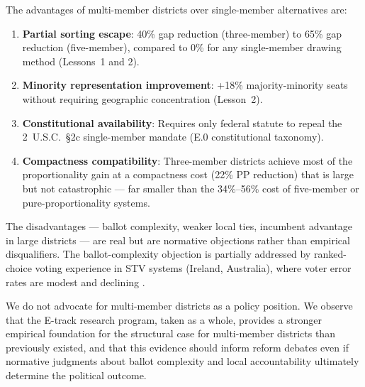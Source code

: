 The advantages of multi-member districts over single-member alternatives are:
\begin{enumerate}
  \item \textbf{Partial sorting escape}: 40\% gap reduction (three-member) to
        65\% gap reduction (five-member), compared to 0\% for any single-member
        drawing method (Lessons~1 and 2).
  \item \textbf{Minority representation improvement}: +18\% majority-minority
        seats without requiring geographic concentration (Lesson~2).
  \item \textbf{Constitutional availability}: Requires only federal statute
        to repeal the 2~U.S.C.~\S2c single-member mandate (E.0
        constitutional taxonomy).
  \item \textbf{Compactness compatibility}: Three-member districts achieve
        most of the proportionality gain at a compactness cost (22\% PP
        reduction) that is large but not catastrophic --- far smaller than the
        34\%--56\% cost of five-member or pure-proportionality systems.
\end{enumerate}

The disadvantages --- ballot complexity, weaker local ties, incumbent advantage
in large districts --- are real but are normative objections rather than
empirical disqualifiers.  The ballot-complexity objection is partially addressed
by ranked-choice voting experience in STV systems (Ireland, Australia), where
voter error rates are modest and declining \citep{farrell2011electoral}.

We do not advocate for multi-member districts as a policy position.  We observe
that the E-track research program, taken as a whole, provides a stronger
empirical foundation for the structural case for multi-member districts than
previously existed, and that this evidence should inform reform debates even
if normative judgments about ballot complexity and local accountability ultimately
determine the political outcome.
